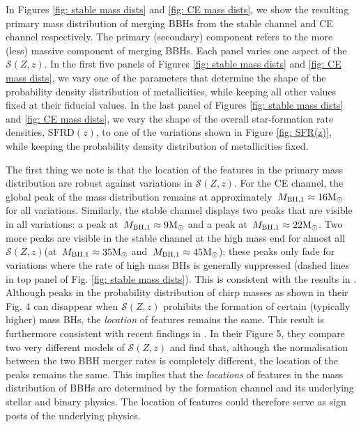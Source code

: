 \documentclass[twocolumn]{aastex631}
\newcommand{\Msun}{\ensuremath{\rm{M}_{\odot}}\xspace}
\newcommand{\Mbheen}{\ensuremath{\,M_{\rm BH, 1}}\xspace}
\newcommand{\SFRDzZ}{\ensuremath{\mathcal{S}(Z,z)}\xspace}
\newcommand{\SFRDz}{\ensuremath{\mathrm{SFRD}(z)}\xspace}
\begin{document}
In Figures \ref{fig: stable mass dists} and \ref{fig: CE mass dists}, we show the resulting primary mass distribution of merging BBHs from the stable channel and CE channel respectively.
The primary (secondary) component refers to the more (less) massive component of merging BBHs. 
Each panel varies one aspect of the \SFRDzZ. In the first five panels of Figures \ref{fig: stable mass dists} and \ref{fig: CE mass dists}, we vary one of the  parameters that determine the shape of the probability density distribution of metallicities, while keeping all other values fixed at their fiducial values. In the last panel of  Figures \ref{fig: stable mass dists} and \ref{fig: CE mass dists}, we vary the shape of the overall star-formation rate densities, \SFRDz, to one of the variations shown in Figure \ref{fig: SFR(z)}, while keeping the probability density distribution of metallicities fixed.


The first thing we note is that the location of the features in the primary mass distribution are robust against variations in \SFRDzZ. For the CE channel, the global peak of the mass distribution remains at approximately $\Mbheen\approx16\Msun$ for all variations. 
Similarly, the stable channel displays two peaks that are visible in all variations: a peak at $\Mbheen\approx9\Msun$ and a peak at $\Mbheen\approx22\Msun$. 
Two more peaks are visible in the stable channel at the high mass end for almost all \SFRDzZ (at $\Mbheen\approx35\Msun$ and $\Mbheen\approx45\Msun$); these peaks only fade for variations where the rate of high mass BHs is generally suppressed (dashed lines in top panel of Fig. \ref{fig: stable mass dists}). 
%
This is consistent with the results in \cite{Broekgaarden+2021b}. Although peaks in the probability distribution of chirp masses as shown in their Fig. 4 can disappear when \SFRDzZ prohibits the formation of certain (typically higher) mass BHs, the \textit{location} of features remains the same. 
%
This result is furthermore consistent with recent findings in \cite{chruslinska2022_review}. In their Figure 5, they compare two very different models of \SFRDzZ and find that, although the normalisation between the two BBH merger rates is completely different, the location of the peaks remains the same. 
%
This implies that the \textit{locations} of features in the mass distribution of BBHs are determined by the formation channel and its underlying stellar and binary physics. The location of features could therefore serve as sign posts of the underlying physics. 
\end{document}

